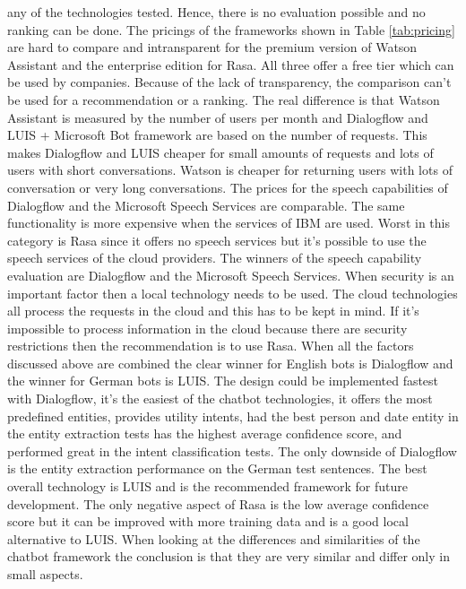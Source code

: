 any of the technologies tested. 
Hence, there is no evaluation possible and no ranking can be done.
The pricings of the frameworks shown in Table \ref{tab:pricing} are hard to compare and intransparent for the premium version of Watson Assistant and the enterprise edition for Rasa.
All three offer a free tier which can be used by companies.
Because of the lack of transparency, the comparison can't be used for a recommendation or a ranking.
The real difference is that Watson Assistant is measured by the number of users per month and 
Dialogflow and LUIS + Microsoft Bot framework are based on the number of requests.
This makes Dialogflow and LUIS cheaper for small amounts of requests and lots of users with short conversations.
Watson is cheaper for returning users with lots of conversation or very long conversations.
The prices for the speech capabilities of Dialogflow and the Microsoft Speech Services are comparable.
The same functionality is more expensive when the services of IBM are used.
Worst in this category is Rasa since it offers no speech services but it's possible to use the 
speech services of the cloud providers.
The winners of the speech capability evaluation are Dialogflow and the Microsoft Speech Services.
When security is an important factor then a local technology needs to be used.
The cloud technologies all process the requests in the cloud and this has to be 
kept in mind.
If it's impossible to process information in the cloud because there are security restrictions
then the recommendation is to use Rasa.
When all the factors discussed above are combined the clear winner for English bots is Dialogflow and the 
winner for German bots is LUIS.
The design could be implemented fastest with Dialogflow, it's the easiest of the chatbot technologies,
it offers the most predefined entities, provides utility intents, had the best person and date
entity in the entity extraction tests has the highest average confidence score, 
and performed great in the intent classification tests.
The only downside of Dialogflow is the entity extraction performance on the German test sentences.
The best overall technology is LUIS and is the recommended framework for future development.
The only negative aspect of Rasa is the low average confidence score but it can be 
improved with more training data and is a good local alternative to LUIS.
When looking at the differences and similarities of the chatbot framework the conclusion is that 
they are very similar and differ only in small aspects.
